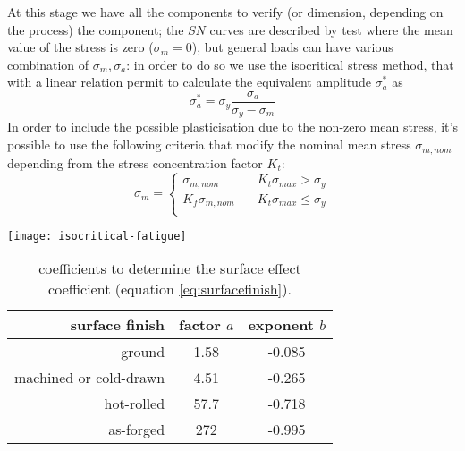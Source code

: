 \begin{multicols}
	At this stage we have all the components to verify (or dimension, depending on the process) the component; the $SN$ curves are described by test where the mean value of the stress is zero ($\sigma_m = 0$), but general loads can have various combination of $\sigma_m,\sigma_a$: in order to do so we use the isocritical stress method, that with a linear relation permit to calculate the equivalent amplitude $\sigma_a^*$ as
	\begin{equation}
		\sigma_a^* = \sigma_y \frac{\sigma_a}{\sigma_y - \sigma_m}
	\end{equation}
	In order to include the possible plasticisation due to the non-zero mean stress, it's possible to use the following criteria that modify the nominal mean stress $\sigma_{m,nom}$ depending from the stress concentration factor $K_t$:
	\[ \sigma_m = \begin{cases}
		\sigma_{m,nom} & K_t \sigma_{max} > \sigma_y \\
		K_f\sigma_{m,nom} \quad & K_t \sigma_{max} \leq \sigma_y \\
	\end{cases} \]
	\begin{center}
		\texttt{[image: isocritical-fatigue]}
	\end{center}
\end{multicols}
	
	\begin{SCtable}[1][bht]
		\centering
		\begin{tabular}{r || c | c}
			\textbf{surface finish} & factor $a$ & exponent $b$ \\ \hline
			ground & 1.58 & -0.085 \\
			machined or cold-drawn & 4.51 & -0.265 \\
			hot-rolled & 57.7 & -0.718 \\
			as-forged & 272 & -0.995
		\end{tabular}
		\caption{coefficients to determine the surface effect coefficient (equation \ref{eq:surfacefinish}).}
		\label{tab:surfacefinish}
	\end{SCtable}

